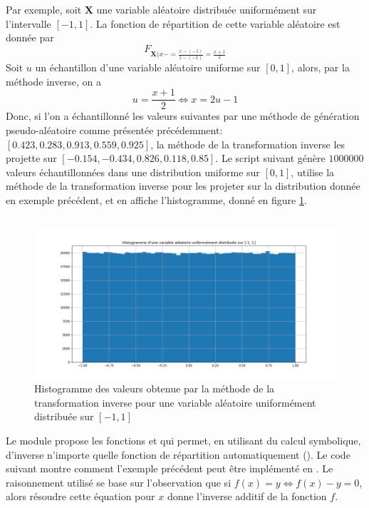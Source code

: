             Par exemple, soit $\mathbf{X}$ une variable aléatoire distribuée uniformément sur l'intervalle $[-1, 1]$. La fonction de répartition de cette variable aléatoire est donnée par
            \begin{equation}
                F_{\mathbf{X}(x- = \frac{x-(-1)}{1-(-1)} = \frac{x+1}{2}}
            \end{equation}
            Soit $u$ un échantillon d'une variable aléatoire uniforme sur $[0, 1]$, alors, par la méthode inverse, on a
            \begin{equation}
                u = \frac{x+1}{2} \Leftrightarrow x = 2u - 1
            \end{equation}
            Donc, si l'on a échantillonné les valeurs suivantes par une méthode de génération pseudo-aléatoire comme présentée précédemment: $[0.423, 0.283, 0.913, 0.559, 0.925]$, la méthode de la transformation inverse les projette sur $[-0.154, -0.434,  0.826,  0.118,  0.85]$. Le script suivant génère $1000000$ valeurs échantillonnées dans une distribution uniforme sur $[0, 1]$, utilise la méthode de la transformation inverse pour les projeter sur la distribution donnée en exemple précédent, et en affiche l'histogramme, donné en figure \ref{fig:inverse_example}.
            \inputminted{python}{codes/inverse_example.py}
            \begin{figure}[h!]
                \centering
                \includegraphics[width=0.8\linewidth]{images/inverse_example.jpg}
                \caption{Histogramme des valeurs obtenue par la méthode de la transformation inverse pour une variable aléatoire uniformément distribuée sur $[-1, 1]$}
                \label{fig:inverse_example}
            \end{figure}

            Le module  propose les fonctions  et  qui permet, en utilisant du calcul symbolique, d'inverse n'importe quelle fonction de répartition automatiquement (\cite{Simpy2023}). Le code suivant montre comment l'exemple précédent peut être implémenté en . Le raisonnement utilisé se base sur l'observation que si $f(x) = y \Leftrightarrow f(x) - y = 0$, alors résoudre cette équation pour $x$ donne l'inverse additif de la fonction $f$.
            \inputminted{python}{codes/inverse_lambda.py}
        
